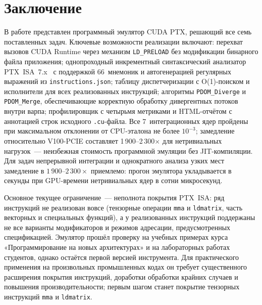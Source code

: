 \section{Заключение}

В работе представлен программный эмулятор CUDA PTX, решающий все семь
поставленных задач. Ключевые возможности реализации включают: перехват
вызовов CUDA Runtime через механизм \texttt{LD\_PRELOAD} без модификации
бинарного файла приложения; однопроходный инкрементный синтаксический анализатор PTX~ISA~7.x~\cite{PTXISA}
с поддержкой 66~мнемоник и автогенерацией регулярных выражений
из \texttt{instructions.json}; таблицу диспетчеризации с O(1)-поиском
и исполнители для всех реализованных инструкций; алгоритмы \texttt{PDOM\_Diverge}
и \texttt{PDOM\_Merge}, обеспечивающие корректную обработку дивергентных потоков
внутри варпа; профилировщик с четырьмя метриками и HTML-отчётом с аннотацией
строк исходного \texttt{.cu}-файла.
Все 7~интеграционных ядер пройдены при максимальном
отклонении от CPU-эталона не более $10^{-3}$; замедление относительно
V100-PCIE составляет 1\,900--2\,300$\times$ для нетривиальных нагрузок~---
неизбежная стоимость программной эмуляции без JIT-компиляции.
Для задач непрерывной интеграции и однократного анализа узких мест замедление в $1\,900$--$2\,300\times$ приемлемо: прогон эмулятора укладывается в секунды при GPU-времени нетривиальных ядер в сотни микросекунд.

Основное текущее ограничение~--- неполнота покрытия PTX~ISA: ряд инструкций не реализован вовсе (тензорные операции \texttt{mma} и \texttt{ldmatrix}, часть векторных и специальных функций), а у реализованных инструкций поддержаны не все варианты модификаторов и режимов адресации, предусмотренных спецификацией.
Эмулятор прошёл проверку на учебных примерах курса «Программирование
на новых архитектурах» и на лабораторных работах студентов, однако
остаётся первой версией инструмента.
Для практического применения на произвольных промышленных кодах он
требует существенного расширения покрытия инструкций, доработки обработки
крайних случаев и повышения производительности; первым шагом станет
покрытие тензорных инструкций \texttt{mma} и \texttt{ldmatrix}.

\newpage
